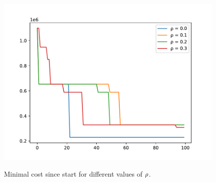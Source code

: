 \begin{figure}[h]
	\begin{centering}
		{\includegraphics[scale=0.8]{figures/experiments/rho.pdf}}
		\caption{Minimal cost since start for different values of $\protect \rho$.}
		\label{fig:rho}
	\end{centering}
\end{figure}
